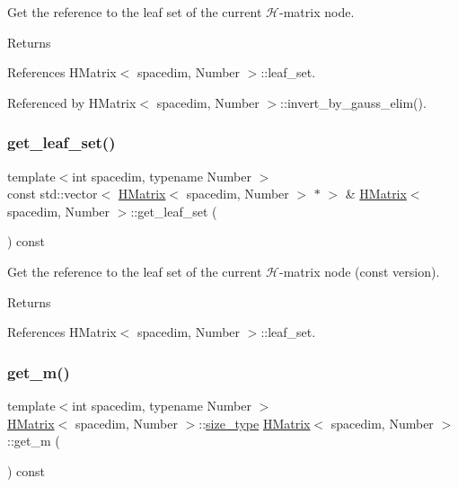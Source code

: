 Get the reference to the leaf set of the current $\mathcal{H}$-\/matrix node. \begin{DoxyReturn}{Returns}

\end{DoxyReturn}


References H\+Matrix$<$ spacedim, Number $>$\+::leaf\+\_\+set.



Referenced by H\+Matrix$<$ spacedim, Number $>$\+::invert\+\_\+by\+\_\+gauss\+\_\+elim().

\mbox{\label{classHMatrix_a851d7bb3632bc1d18538d4d1dd5f6393}} 
\subsubsection{\texorpdfstring{get\+\_\+leaf\+\_\+set()}{get\_leaf\_set()}\hspace{0.1cm}{\footnotesize\ttfamily [2/2]}}
{\footnotesize\ttfamily template$<$int spacedim, typename Number $>$ \\
const std\+::vector$<$ \hyperlink{classHMatrix}{H\+Matrix}$<$ spacedim, Number $>$ $\ast$ $>$ \& \hyperlink{classHMatrix}{H\+Matrix}$<$ spacedim, Number $>$\+::get\+\_\+leaf\+\_\+set (\begin{DoxyParamCaption}{ }\end{DoxyParamCaption}) const}

Get the reference to the leaf set of the current $\mathcal{H}$-\/matrix node (const version). \begin{DoxyReturn}{Returns}

\end{DoxyReturn}


References H\+Matrix$<$ spacedim, Number $>$\+::leaf\+\_\+set.

\mbox{\label{classHMatrix_aabe735f7712a10ba5325ff116f8ca1c7}} 
\subsubsection{\texorpdfstring{get\+\_\+m()}{get\_m()}}
{\footnotesize\ttfamily template$<$int spacedim, typename Number $>$ \\
\hyperlink{classHMatrix}{H\+Matrix}$<$ spacedim, Number $>$\+::\hyperlink{classHMatrix_a5ca8dc549783d38371a01ecd621ecb34}{size\+\_\+type} \hyperlink{classHMatrix}{H\+Matrix}$<$ spacedim, Number $>$\+::get\+\_\+m (\begin{DoxyParamCaption}{ }\end{DoxyParamCaption}) const}

